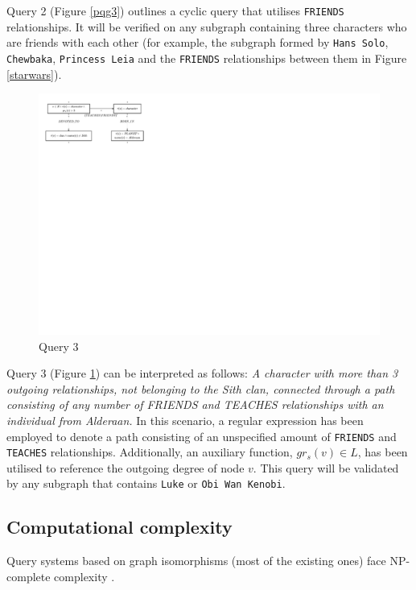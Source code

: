 \documentclass[mathematics,article,submit,pdftex,moreauthors]{Definitions/mdpi}
\begin{document}
Query 2 (Figure \ref{pqg3}) outlines a cyclic query that utilises \texttt{FRIENDS} relationships. It will be verified on any subgraph containing three characters who are friends with each other (for example, the subgraph formed by \texttt{Hans Solo}, \texttt{Chewbaka}, \texttt{Princess Leia} and the \texttt{FRIENDS} relationships between them in Figure \ref{starwars}).

\begin{figure}[h]
    \begin{center}
        \includegraphics[width=\columnwidth]{png/PQG4.pdf}
    \end{center}
    \caption{%
        Query 3
    }%
    \label{pqg4}
\end{figure}

Query 3 (Figure \ref{pqg4}) can be interpreted as follows: \textit{A character with more than 3 outgoing relationships, not belonging to the Sith clan, connected through a path consisting of any number of FRIENDS and TEACHES relationships with an individual from Alderaan.} In this scenario, a regular expression has been employed to denote a path consisting of an unspecified amount of \texttt{FRIENDS} and \texttt{TEACHES} relationships. Additionally, an auxiliary function, $gr_s(v) \in L$, has been utilised to reference the outgoing degree of node $v$. This query will be validated by any subgraph that contains \texttt{Luke} or \texttt{Obi Wan Kenobi}.

\subsection{Computational complexity}
\label{cc}
Query systems based on graph isomorphisms (most of the existing ones) face NP-complete complexity  \citep{karp1975computational,Cook:1971:CTP:800157.805047}.
\end{document}
